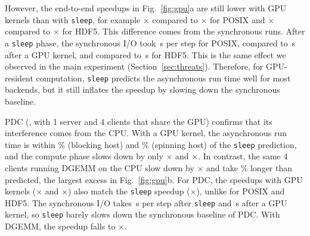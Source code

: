 However, the end-to-end speedups in Fig.~\ref{fig:gpu}a are still lower with
GPU kernels than with \texttt{sleep}, for example \GpuPosixGpuBlock$\times$
compared to \GpuPosixSleep$\times$ for POSIX and \GpuHdfGpuBlock$\times$
compared to \GpuHdfSleep$\times$ for HDF5. This difference comes from the
synchronous runs. After a \texttt{sleep} phase, the synchronous I/O took
\GpusynciosleepPosix\,s per step for POSIX, compared to
\GpusyncioblockPosix\,s after a GPU kernel, and \GpusynciosleepHdf compared to
\GpusyncioblockHdf\,s for HDF5. This is the same effect we observed in the
main experiment (Section~\ref{sec:threats}). Therefore, for GPU-resident
computation, \texttt{sleep} predicts the asynchronous run time well for most
backends, but it still inflates the speedup by slowing down the synchronous
baseline.

PDC (\srcPhasePdcGpu, with 1 server and 4 clients that share the GPU)
confirms that its interference comes from the CPU. With a GPU kernel, the
asynchronous run time is within \GpuexcpctPdcGpuBlock\% (blocking host) and
\GpuexcpctPdcGpuSpin\% (spinning host) of the \texttt{sleep} prediction, and
the compute phase slows down by only \GpuslowPdcGpuBlock$\times$ and
\GpuslowPdcGpuSpin$\times$. In contrast, the same 4 clients running DGEMM on
the CPU slow down by \GpuslowPdcDgemm$\times$ and take
\GpuexcpctPdcDgemm\% longer than predicted, the largest excess in
Fig.~\ref{fig:gpu}b. For PDC, the speedups with GPU kernels
(\GpuPdcGpuBlock$\times$ and \GpuPdcGpuSpin$\times$) also match the
\texttt{sleep} speedup (\GpuPdcSleep$\times$), unlike for POSIX and HDF5. The
synchronous I/O takes \GpusynciosleepPdc\,s per step after \texttt{sleep}
and \GpusyncioblockPdc\,s after a GPU kernel, so \texttt{sleep} barely
slows down the synchronous baseline of PDC. With DGEMM, the speedup falls to
\GpuPdcDgemm$\times$.

